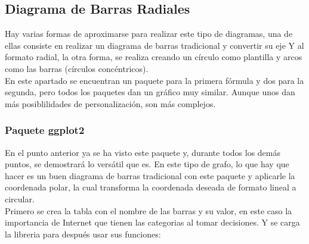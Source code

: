 \documentclass{article}\usepackage[]{graphicx}\usepackage[]{color}
\begin{document}
\subsection{Diagrama de Barras Radiales} \label{ssec:barrasRadiales}
Hay varias formas de aproximarse para realizar este tipo de diagramas, una de ellas consiste en realizar un diagrama de barras tradicional y convertir su eje Y al formato radial, la otra forma, se realiza creando un c\'irculo como plantilla y arcos como las barras (c\'irculos conc\'entricos).~\\
En este apartado se encuentran un paquete para la primera f\'ormula y dos para la segunda, pero todos los paquetes dan un gr\'afico muy similar. Aunque unos dan m\'as  posiblilidades de personalizaci\'on, son m\'as complejos.
\subsubsection{Paquete ggplot2}
En el punto anterior ya se ha visto este paquete\cite{docu_ggplot2}
 y, durante todos los dem\'as puntos, se demostrar\'a lo vers\'atil que es. En este tipo de grafo, lo que hay que hacer es un buen diagrama de barras tradicional con este paquete y aplicarle la coordenada polar, la cual transforma la coordenada deseada de formato lineal a circular.~\\
Primero se crea la tabla con el nombre de las barras y su valor, en este caso la importancia de Internet que tienen las categorias al tomar decisiones. Y se carga la libreria para despu\'es usar sus funciones:
\end{document}
